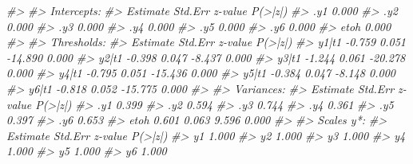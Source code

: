 \documentclass[
  11pt,
]{krantz}
\makeatletter
\newenvironment{Shaded}{\begin{snugshade}}{\end{snugshade}}
\newcommand{\CommentTok}[1]{\textcolor[rgb]{0.37,0.37,0.37}{\textit{#1}}}
\newenvironment{kframe}{%
\medskip{}
\setlength{\fboxsep}{.8em}
 \def\at@end@of@kframe{}%
 \ifinner\ifhmode%
  \def\at@end@of@kframe{\end{minipage}}%
  \begin{minipage}{\columnwidth}%
 \fi\fi%
 \def\FrameCommand##1{\hskip\@totalleftmargin \hskip-\fboxsep
 \colorbox{shadecolor}{##1}\hskip-\fboxsep
     \hskip-\linewidth \hskip-\@totalleftmargin \hskip\columnwidth}%
 \MakeFramed {\advance\hsize-\width
   \@totalleftmargin\z@ \linewidth\hsize
   \@setminipage}}%
 {\par\unskip\endMakeFramed%
 \at@end@of@kframe}
\renewenvironment{Shaded}{\begin{kframe}}{\end{kframe}}
\theoremstyle{definition}
\theoremstyle{definition}
\theoremstyle{definition}
\theoremstyle{definition}
\theoremstyle{remark}
\makeatother
\begin{document}
\begin{Shaded}
\begin{Highlighting}[]
\CommentTok{\#\textgreater{} }
\CommentTok{\#\textgreater{} Intercepts:}
\CommentTok{\#\textgreater{}                    Estimate  Std.Err  z{-}value  P(\textgreater{}|z|)}
\CommentTok{\#\textgreater{}    .y1                0.000                           }
\CommentTok{\#\textgreater{}    .y2                0.000                           }
\CommentTok{\#\textgreater{}    .y3                0.000                           }
\CommentTok{\#\textgreater{}    .y4                0.000                           }
\CommentTok{\#\textgreater{}    .y5                0.000                           }
\CommentTok{\#\textgreater{}    .y6                0.000                           }
\CommentTok{\#\textgreater{}     etoh              0.000                           }
\CommentTok{\#\textgreater{} }
\CommentTok{\#\textgreater{} Thresholds:}
\CommentTok{\#\textgreater{}                    Estimate  Std.Err  z{-}value  P(\textgreater{}|z|)}
\CommentTok{\#\textgreater{}     y1|t1            {-}0.759    0.051  {-}14.890    0.000}
\CommentTok{\#\textgreater{}     y2|t1            {-}0.398    0.047   {-}8.437    0.000}
\CommentTok{\#\textgreater{}     y3|t1            {-}1.244    0.061  {-}20.278    0.000}
\CommentTok{\#\textgreater{}     y4|t1            {-}0.795    0.051  {-}15.436    0.000}
\CommentTok{\#\textgreater{}     y5|t1            {-}0.384    0.047   {-}8.148    0.000}
\CommentTok{\#\textgreater{}     y6|t1            {-}0.818    0.052  {-}15.775    0.000}
\CommentTok{\#\textgreater{} }
\CommentTok{\#\textgreater{} Variances:}
\CommentTok{\#\textgreater{}                    Estimate  Std.Err  z{-}value  P(\textgreater{}|z|)}
\CommentTok{\#\textgreater{}    .y1                0.399                           }
\CommentTok{\#\textgreater{}    .y2                0.594                           }
\CommentTok{\#\textgreater{}    .y3                0.744                           }
\CommentTok{\#\textgreater{}    .y4                0.361                           }
\CommentTok{\#\textgreater{}    .y5                0.397                           }
\CommentTok{\#\textgreater{}    .y6                0.653                           }
\CommentTok{\#\textgreater{}     etoh              0.601    0.063    9.596    0.000}
\CommentTok{\#\textgreater{} }
\CommentTok{\#\textgreater{} Scales y*:}
\CommentTok{\#\textgreater{}                    Estimate  Std.Err  z{-}value  P(\textgreater{}|z|)}
\CommentTok{\#\textgreater{}     y1                1.000                           }
\CommentTok{\#\textgreater{}     y2                1.000                           }
\CommentTok{\#\textgreater{}     y3                1.000                           }
\CommentTok{\#\textgreater{}     y4                1.000                           }
\CommentTok{\#\textgreater{}     y5                1.000                           }
\CommentTok{\#\textgreater{}     y6                1.000}
\end{Highlighting}
\end{Shaded}
\end{document}
